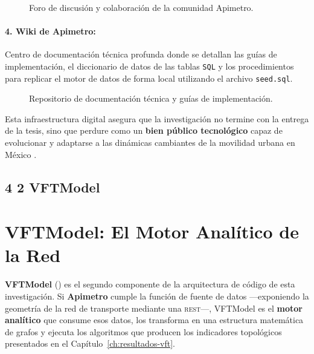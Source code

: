\begin{figure}[htbp]
  \centering
  \caption{Foro de discusi{\'o}n y colaboraci{\'o}n de la comunidad Apimetro.}
  \label{fig:screenshot-discussions}
\end{figure}

\paragraph{4. Wiki de Apimetro:} Centro de documentación técnica profunda donde se detallan las guías de implementación, el diccionario de datos de las tablas \texttt{SQL} y los procedimientos para replicar el motor de datos de forma local 
utilizando el archivo \texttt{seed.sql}.

\begin{figure}[htbp]
  \centering
  \caption{Repositorio de documentaci{\'o}n t{\'e}cnica y gu{\'i}as de implementaci{\'o}n.}
  \label{fig:screenshot-wiki}
\end{figure}

Esta infraestructura digital asegura que la investigación no termine con la entrega de la tesis, sino que perdure como un \textbf{bien público tecnológico} capaz de evolucionar y adaptarse a las dinámicas cambiantes de la movilidad 
urbana en México \parencite{fortin2016innovative}.

\subsection*{4 2 VFTModel}

\section{VFTModel: El Motor Analítico de la Red}
\label{sec:vftmodel-intro}

\textbf{VFTModel} () es el segundo componente
de la arquitectura de código de esta investigación. Si \textbf{Apimetro} cumple
la función de fuente de datos —exponiendo la geometría de la red de transporte
mediante una \api{} \textsc{rest}—, VFTModel es el \textbf{motor analítico}
que consume esos datos, los transforma en una estructura matemática de grafos y
ejecuta los algoritmos que producen los indicadores topológicos presentados en
el Capítulo~\ref{ch:resultados-vft}.

